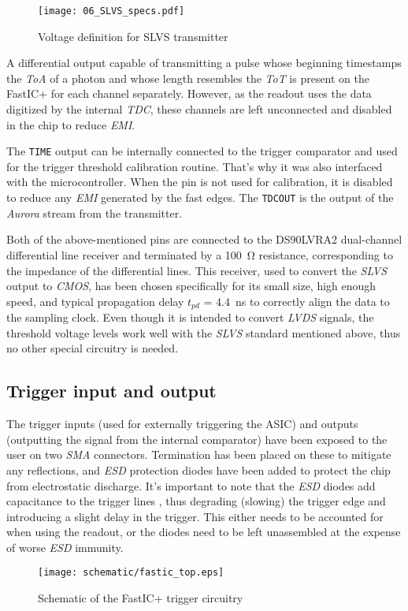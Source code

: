 \begin{figure}[ht]
	\begin{center}
		\texttt{[image: 06\_SLVS\_specs.pdf]}
	\end{center}
	\vspace{-5mm}
	\caption{Voltage definition for SLVS transmitter}
	\label{fig:slvs_voltages}
\end{figure}

A differential output capable of transmitting a pulse whose beginning timestamps the \emph{ToA} of a photon and whose length resembles the \emph{ToT} is present on the FastIC+ for each channel separately. However, as the readout uses the data digitized by the internal \emph{TDC}, these channels are left unconnected and disabled in the chip to reduce \emph{EMI}. \cite{ficDatasheet}

The \verb|TIME| output can be internally connected to the trigger comparator and used for the trigger threshold calibration routine. That's why it was also interfaced with the microcontroller. When the pin is not used for calibration, it is disabled to reduce any \emph{EMI} generated by the fast edges. The \verb|TDCOUT| is the output of the \emph{Aurora} stream from the transmitter. \cite{ficDatasheet}

Both of the above-mentioned pins are connected to the DS90LVRA2 dual-channel differential line receiver and terminated by a \SI{100}{\ohm} resistance, corresponding to the impedance of the differential lines. This receiver, used to convert the \emph{SLVS} output to \emph{CMOS}, has been chosen specifically for its small size, high enough speed, and typical propagation delay $t_{pd}$ = \SI{4.4}{\nano\second} to correctly align the data to the sampling clock. Even though it is intended to convert \emph{LVDS} signals, the threshold voltage levels work well with the \emph{SLVS} standard mentioned above, thus no other special circuitry is needed. \cite{ds90lvra2_datasheet}

\subsection{Trigger input and output}
The trigger inputs (used for externally triggering the ASIC) and outputs (outputting the signal from the internal comparator) have been exposed to the user on two \emph{SMA} connectors. Termination has been placed on these to mitigate any reflections, and \emph{ESD} protection diodes have been added to protect the chip from electrostatic discharge. It's important to note that the \emph{ESD} diodes add capacitance to the trigger lines \cite{pesd1v2y1bsf_datasheet}\cite{bav99_datasheet}, thus degrading (slowing) the trigger edge and introducing a slight delay in the trigger. This either needs to be accounted for when using the readout, or the diodes need to be left unassembled at the expense of worse \emph{ESD} immunity. 
%
\FloatBarrier
\begin{figure}[htp!]
    \centering
    \texttt{[image: schematic/fastic\_top.eps]}
    \caption{Schematic of the FastIC+ trigger circuitry}
    \label{fig:schem_fastic_triggers}
\end{figure}
\FloatBarrier

